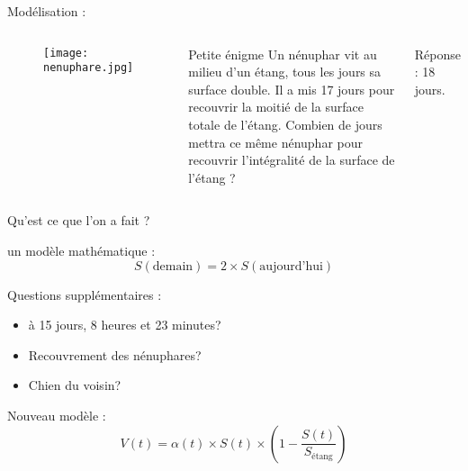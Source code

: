 \documentclass[11pt]{beamer}
\begin{document}
\begin{frame}{Modélisation :}
\pause
\begin{columns}
\begin{center}
\begin{figure}
\texttt{[image: nenuphare.jpg]}
\end{figure}
\end{center}


\begin{block}{Petite énigme}
Un nénuphar vit au milieu d'un étang, tous les jours sa surface double. Il a mis 17 jours pour recouvrir la moitié de la surface totale de l'étang. Combien de jours mettra ce même nénuphar pour recouvrir l'intégralité de la surface de l'étang ?
\end{block}

\pause
\begin{flushright}
Réponse : 18 jours.
\end{flushright}
\end{columns}

\end{frame}

\begin{frame}{Qu'est ce que l'on a fait ?}
\begin{block}{un modèle mathématique :}
$$S(\text{demain}) = 2 \times S(\text{aujourd'hui})$$
\end{block}

Questions supplémentaires :
\begin{itemize}
\item à 15 jours, 8 heures et 23 minutes?
\item Recouvrement des nénuphares?
\item Chien du voisin?
\end{itemize}

\begin{block}{Nouveau modèle : }
$$V(t) = \alpha(t) \times S(t) \times \left( 1 - \dfrac{S(t)}{S_{\text{étang}}} \right)$$
\end{block}

\end{frame}
\end{document}
